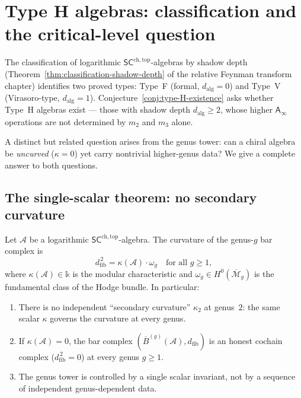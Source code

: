 \documentclass[11pt]{article}
\newcommand{\cA}{\mathcal{A}}
\newcommand{\cM}{\mathcal{M}}
\newcommand{\barB}{\overline{B}}
\newcommand{\bD}{\mathbb{D}}
\newcommand{\Ainf}{\mathsf{A}_{\infty}}
\newcommand{\SCchtop}{\mathsf{SC}^{\mathrm{ch,top}}}
\newcommand{\dfib}{d_{\mathrm{fib}}}
\begin{document}
%
%

\section{Type H algebras: classification and the critical-level question}
\label{sec:type-H}

\providecommand{\dalg}{d_{\mathrm{alg}}}
\providecommand{\dfib}{d_{\mathrm{fib}}}
\providecommand{\hvee}{h^{\!\scriptscriptstyle\vee}}
\providecommand{\bD}{\mathbb{D}}

The classification of logarithmic $\SCchtop$-algebras by shadow depth
(Theorem~\ref{thm:classification-shadow-depth} of the relative Feynman
transform chapter) identifies two proved types: Type~F (formal,
$\dalg = 0$) and Type~V (Virasoro-type, $\dalg = 1$).
Conjecture~\ref{conj:type-H-existence} asks whether Type~H algebras
exist --- those with shadow depth $\dalg \geq 2$, whose higher
$\Ainf$ operations are not determined by $m_2$ and $m_3$ alone.

A distinct but related question arises from the genus tower: can
a chiral algebra be \emph{uncurved} ($\kappa = 0$) yet carry nontrivial
higher-genus data?  We give a complete answer to both questions.

\subsection{The single-scalar theorem: no secondary curvature}

\begin{theorem}
\label{thm:no-secondary-curvature}
Let $\cA$ be a logarithmic $\SCchtop$-algebra.
The curvature of the genus-$g$ bar complex is
\begin{equation}\label{eq:universal-curvature}
\dfib^{\,2} = \kappa(\cA) \cdot \omega_g
\quad \text{for all } g \geq 1,
\end{equation}
where $\kappa(\cA) \in \mathbb{k}$ is the modular characteristic
and $\omega_g \in H^0(\overline{\cM}_g)$ is the fundamental class
of the Hodge bundle.  In particular:
\begin{enumerate}[label=\textup{(\roman*)}]
\item There is no independent ``secondary curvature'' $\kappa_2$
  at genus~$2$: the same scalar $\kappa$ governs the curvature
  at every genus.
\item If $\kappa(\cA) = 0$, the bar complex
  $(\barB^{(g)}(\cA), \dfib)$ is an honest cochain complex
  ($\dfib^{\,2} = 0$) at every genus $g \geq 1$.
\item The genus tower is controlled by a single scalar invariant,
  not by a sequence of independent genus-dependent data.
\end{enumerate}
\end{theorem}
\end{document}
